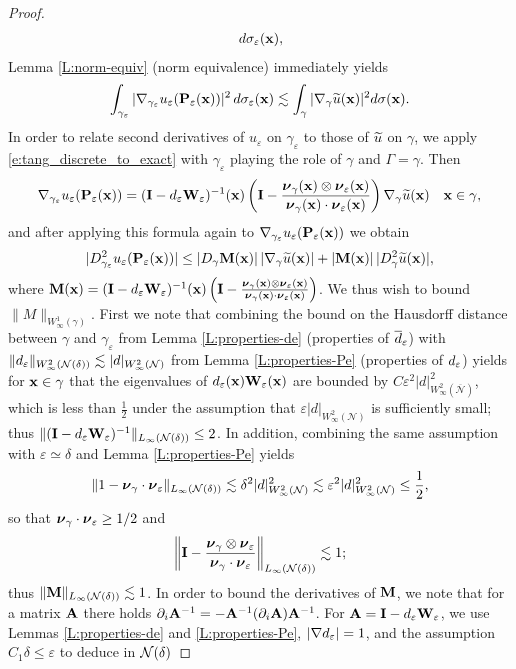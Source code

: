 \begin{proof}
\begin{align*}
\, d\sigma_\varepsilon({\bf x}),
\end{align*}
%
Lemma \ref{L:norm-equiv} (norm equivalence) immediately yields
\[ \int_{\gamma_\varepsilon} |\nabla_{\gamma_\varepsilon} u_\varepsilon({\bf P}_\varepsilon({\bf x}))|^2 \, d\sigma_\varepsilon({\bf x}) \lesssim \int_\gamma |\nabla_\gamma \widetilde{u}({\bf x})|^2 d \sigma({\bf x}).
\]
In order to relate second derivatives of $u_\varepsilon$ on $\gamma_\varepsilon$ to those of $\widetilde{u}$ on $\gamma$, we apply \eqref{e:tang_discrete_to_exact} with $\gamma_\varepsilon$ playing the role of $\gamma$ and $\Gamma=\gamma$.  Then
\[
\nabla_{\gamma_\varepsilon} u_\varepsilon ({\bf P}_\varepsilon({\bf x})) = ({\bf I} -d_\varepsilon {\bf W}_\varepsilon)^{-1}({\bf x}) \left({\bf I} - \frac{{\boldsymbol \nu}_\gamma({\bf x}) \otimes {\boldsymbol \nu}_\varepsilon({\bf x})}{{\boldsymbol \nu}_\gamma({\bf x}) \cdot {\boldsymbol \nu}_\varepsilon({\bf x})}\right) \nabla_\gamma \widetilde{u}({\bf x}) \quad {\bf x} \in \gamma,
\]
and after applying this formula again to $\nabla_{\gamma_\varepsilon} u_\varepsilon ({\bf P}_\varepsilon({\bf x}))$ we obtain
\[
|D_{\gamma_\varepsilon}^2 u_\varepsilon({\bf P}_\varepsilon({\bf x}))| \le |D_\gamma {\bf M}({\bf x})| \, |\nabla_\gamma \widetilde{u}({\bf x})|+ |{\bf M}({\bf x})| \, |D_\gamma^2 \widetilde{u}({\bf x})|,
\]
%
where ${\bf M}({\bf x})=({\bf I} -d_\varepsilon {\bf W}_\varepsilon)^{-1}({\bf x}) \left({\bf I} - \frac{{\boldsymbol \nu}_\gamma({\bf x}) \otimes {\boldsymbol \nu}_\varepsilon({\bf x})}{{\boldsymbol \nu}_\gamma({\bf x}) \cdot {\boldsymbol \nu}_\varepsilon({\bf x})}\right)$.
We thus wish to bound $\|M\|_{W_\infty^1(\gamma)}$.  First we note that combining the bound on the Hausdorff distance between $\gamma$ and $\gamma_\varepsilon$ from Lemma \ref{L:properties-de} (properties of $\overline{d}_\varepsilon$) with $\|d_\varepsilon\|_{W_\infty^2(\mathcal{N}(\delta))} \lesssim |d|_{W_\infty^2(\mathcal{N})}$ from Lemma \ref{L:properties-Pe} (properties of $d_\varepsilon$) yields for ${\bf x} \in \gamma$ that the eigenvalues of $d_\varepsilon({\bf x}) {\bf W}_\varepsilon({\bf x})$  are bounded by $C \varepsilon^2|d|_{W_\infty^2(\overline{\mathcal{N}})}^2$, which is less than $\frac{1}{2}$ under the assumption that $\varepsilon |d|_{W_\infty^2(\mathcal{N})}$ is sufficiently small; thus $\|({\bf I}-d_\varepsilon {\bf W}_\varepsilon)^{-1}\|_{L_\infty({\mathcal{N}(\delta)})} \le 2$. In addition, combining the same assumption with $\varepsilon \simeq \delta$ and Lemma \ref{L:properties-Pe} yields
\[ 
\|1-{\boldsymbol \nu}_\gamma\cdot {\boldsymbol \nu}_\varepsilon\|_{L_\infty(\mathcal{N}(\delta))} \lesssim \delta^2|d|_{W_\infty^2(\mathcal{N})}^2 \lesssim \varepsilon^2 |d|_{W_\infty^2(\mathcal{N})}^2 \le \frac{1}{2},
\]
so that ${\boldsymbol \nu}_\gamma\cdot {\boldsymbol \nu}_\varepsilon \ge 1/2$ and
 \[
 \left \|{\bf I} - \frac{{\boldsymbol \nu}_\gamma \otimes {\boldsymbol \nu}_\varepsilon}{{\boldsymbol \nu}_\gamma \cdot {\boldsymbol \nu}_\varepsilon}\right\|_{L_\infty({\mathcal{N}(\delta)})} \lesssim 1 ;
 \]
thus $\|{\bf M}\|_{L_\infty({\mathcal{N}(\delta)})} \lesssim 1$. In order to bound the derivatives of ${\bf M}$, we note that for a matrix ${\bf A}$ there holds  $\partial_i {\bf A}^{-1} = -{\bf A}^{-1}( \partial_i {\bf A}) {\bf A}^{-1}$.  For ${\bf A}={\bf I}-d_\varepsilon {\bf W}_\varepsilon$, we use Lemmas \ref{L:properties-de} and \ref{L:properties-Pe}, $|\nabla d_\varepsilon|=1$, and the assumption $C_1\delta\le\varepsilon$ to deduce in ${\mathcal{N}(\delta)}$

\end{proof}
